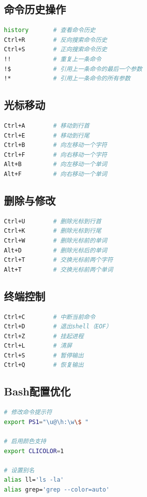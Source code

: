 \documentclass[12pt,UTF8]{ctexbook}
\begin{document}
\subsection*{命令历史操作}
\begin{lstlisting}[language=bash]
history       # 查看命令历史
Ctrl+R        # 反向搜索命令历史
Ctrl+S        # 正向搜索命令历史
!!            # 重复上一条命令
!$            # 引用上一条命令的最后一个参数
!*            # 引用上一条命令的所有参数
\end{lstlisting}

\subsection*{光标移动}
\begin{lstlisting}[language=bash]
Ctrl+A        # 移动到行首
Ctrl+E        # 移动到行尾
Ctrl+B        # 向左移动一个字符
Ctrl+F        # 向右移动一个字符
Alt+B         # 向左移动一个单词
Alt+F         # 向右移动一个单词
\end{lstlisting}

\subsection*{删除与修改}
\begin{lstlisting}[language=bash]
Ctrl+U        # 删除光标到行首
Ctrl+K        # 删除光标到行尾
Ctrl+W        # 删除光标前的单词
Alt+D         # 删除光标后的单词
Ctrl+T        # 交换光标前两个字符
Alt+T         # 交换光标前两个单词
\end{lstlisting}

\subsection*{终端控制}
\begin{lstlisting}[language=bash]
Ctrl+C        # 中断当前命令
Ctrl+D        # 退出shell（EOF）
Ctrl+Z        # 挂起进程
Ctrl+L        # 清屏
Ctrl+S        # 暂停输出
Ctrl+Q        # 恢复输出
\end{lstlisting}

\subsection*{Bash配置优化}
\begin{lstlisting}[language=bash]
# 修改命令提示符
export PS1="\u@\h:\w\$ "

# 启用颜色支持
export CLICOLOR=1

# 设置别名
alias ll='ls -la'
alias grep='grep --color=auto'
\end{lstlisting}
\end{document}
